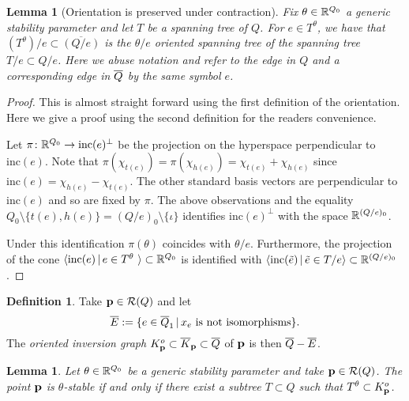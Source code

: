 \documentclass{amsart}
\newtheorem{lem}[thm]{Lemma}
\theoremstyle{definition}
\newtheorem{defn}[thm]{Definition}
\begin{document}
\begin{lem}[Orientation is preserved under contraction]
Fix $\theta \in \mathbb{R}^{Q_0}$ a generic stability parameter and let $T$ be a spanning tree of $Q$.
For $e \in T^\theta$, we have that $(T^\theta)/e \subset \overline{(Q/e)}$ is the $\theta/e$ oriented spanning tree of the spanning tree $T/e \subset Q/e$.
Here we abuse notation and refer to the edge in $Q$ and a corresponding edge in ${\overline{Q}}$ by the same symbol $e$.
\end{lem}

\begin{proof}
This is almost straight forward using the first definition of the orientation.
Here we give a proof using the second definition for the readers convenience.

Let $\pi\colon \mathbb{R}^{Q_0}\rightarrow \text{inc}(e)^\perp$ be the projection on the hyperspace perpendicular to $\text{inc}(e)$.
Note that $\pi(\chi_{t(e)}) = \pi(\chi_{h(e)}) = \chi_{t(e)} + \chi_{h(e)}$ since $\text{inc}(e)= \chi_{h(e)} - \chi_{t(e)}.$
The other standard basis vectors are perpendicular to $\text{inc}(e)$ and so are fixed by $\pi$.
The above observations and the equality $Q_0 \setminus \{t(e), h(e)\} = (Q/e)_0 \setminus \{\iota\}$ identifies $\text{inc}(e)^\perp$ with the space $\mathbb{R}^{(Q/e)_0}$.

Under this identification $\pi(\theta)$ coincides with $\theta/e$.
Furthermore, the projection of the cone $\langle \text{inc}(e) \,|\, e\in T^\theta\ \rangle \subset \mathbb{R}^{Q_0}$ is identified with $\langle\text{inc}(\tilde{e}) \, | \, \tilde{e} \in T/e\rangle \subset \mathbb{R}^{(Q/e)_0}$.
\end{proof}

\begin{defn}
Take $\mathbf{p} \in \mathcal{R}(Q)$ and let $${\overline{E}} :=\{e\in {\overline{Q}}_1 \,|\, x_e \text{ is not isomorphisms}\}.$$   
The {\em oriented inversion graph} $K_{\mathbf{p}}^o \subset {\overline{K}}_{\mathbf{p}} \subset {\overline{Q}}$ of $\mathbf{p}$ is then ${\overline{Q}} - {\overline{E}}$.
\end{defn}


\begin{lem}\label{lm:orientedtree}
Let $\theta \in \mathbb{R}^{Q_0}$ be a generic stability parameter and take $\mathbf{p} \in \mathcal{R}(Q)$. 
The point $\mathbf{p}$ is $\theta$-stable if and only if there exist a subtree $T\subset Q$ such that $T^\theta \subset K_{\mathbf{p}}^o$.
\end{lem}
\end{document}
